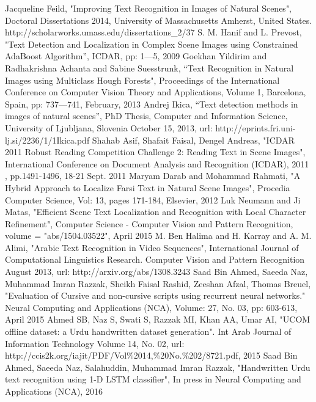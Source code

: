 \documentclass[conference]{IEEEtran}
\begin{document}
\begin{thebibliography}{1}


 
Jacqueline Feild, "Improving Text Recognition in Images of Natural Scenes", Doctoral Dissertations 2014, University of Massachusetts Amherst, United States. http://scholarworks.umass.edu/dissertations\_2/37
S. M. Hanif and L. Prevost, "Text Detection and Localization in Complex Scene Images using Constrained AdaBoost Algorithm”, ICDAR, pp: 1—5, 2009
Goekhan Yildirim and Radhakrishna Achanta and  Sabine Suesstrunk, “Text Recognition in Natural Images using Multiclass Hough Forests", Proceedings of the International Conference on Computer Vision Theory and Applications, Volume 1, Barcelona, Spain, pp: 737—741, February, 2013
Andrej Ikica, “Text detection methods in images of natural scenes”, PhD Thesis, Computer and Information Science, University of Ljubljana, Slovenia  October 15, 2013, url: http://eprints.fri.uni-lj.si/2236/1/1Ikica.pdf
Shahab Asif, Shafait Faisal, Dengel Andreas, "ICDAR 2011 Robust Reading Competition Challenge 2: Reading Text in Scene Images", International Conference on Document Analysis and Recognition (ICDAR), 2011 , pp.1491-1496, 18-21 Sept. 2011
Maryam Darab and Mohammad Rahmati, "A Hybrid Approach to Localize Farsi Text in Natural Scene Images",  Procedia Computer Science, Vol: 13, pages 171-184, Elsevier, 2012
Luk Neumann and Ji Matas, "Efficient Scene Text Localization and Recognition with Local Character Refinement", Computer Science - Computer Vision and Pattern Recognition, volume = "abs/1504.03522", April 2015
 M. Ben Halima and H. Karray and A. M. Alimi, "Arabic Text Recognition in Video Sequences", International Journal of Computational Linguistics Research. Computer Vision and Pattern Recognition  August 2013, url: http://arxiv.org/abs/1308.3243
Saad Bin Ahmed, Saeeda Naz, Muhammad Imran Razzak, Sheikh Faisal Rashid, Zeeshan Afzal, Thomas Breuel, "Evaluation of Cursive and non-cursive scripts using recurrent neural networks." Neural Computing and Applications (NCA), Volume: 27, No. 03, pp: 603-613, April 2015
Ahmed SB, Naz S, Swati S, Razzak MI, Khan AA, Umar AI, "UCOM offline dataset: a Urdu handwritten dataset generation". Int Arab Journal of Information Technology Volume 14, No. 02, url:  http://ccis2k.org/iajit/PDF/Vol\%2014,\%20No.\%202/8721.pdf,	2015
Saad Bin Ahmed, Saeeda Naz, Salahuddin, Muhammad Imran Razzak, "Handwritten Urdu text recognition using 1-D LSTM classifier", In press in Neural Computing and Applications (NCA), 2016

\end{thebibliography}
\end{document}
